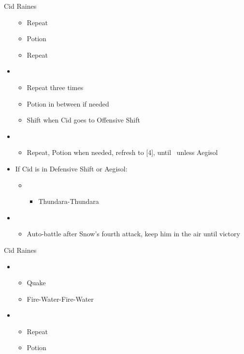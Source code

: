 \begin{paracol}{2}
\begin{battle}{Cid Raines}
\begin{itemize}
\begin{itemize}
				      \item Repeat
				      \item Potion
				      \item Repeat
			      \end{itemize}
			\item \second
			      \begin{itemize}
				      \item Repeat three times
				      \item Potion in between if needed
				      \item Shift when Cid goes to Offensive Shift
			      \end{itemize}
			\item \third
			      \begin{itemize}
				      \item Repeat, Potion when needed, refresh to [4], until \stagger\ unless Aegisol
			      \end{itemize}
			\item If Cid is in Defensive Shift or Aegisol:
			      \begin{itemize}
				      \item \second
				            \begin{itemize}
					            \item Thundara-Thundara
				            \end{itemize}
			      \end{itemize}
			\item \sixth
			      \begin{itemize}
				      \item Auto-battle after Snow's fourth attack, keep him in the air until victory
			      \end{itemize}
		\end{itemize}
	\end{battle}
	\switchcolumn
	\begin{battle}{Cid Raines}
		\begin{itemize}
			\item \first
			      \begin{itemize}
				      \item Quake
				      \item Fire-Water-Fire-Water
			      \end{itemize}
			\item \third
			      \begin{itemize}
				      \item Repeat
				      \item Potion

\end{itemize}
\end{itemize}
\end{battle}
\end{paracol}
